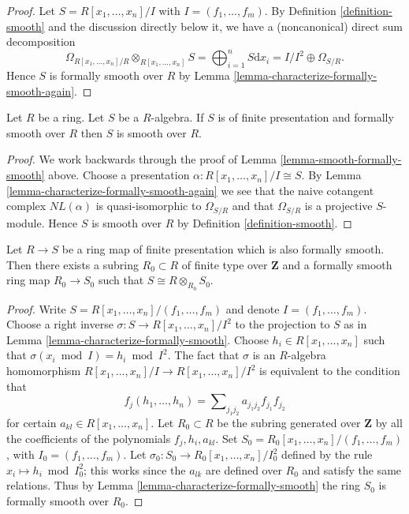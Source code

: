 \begin{proof}
Let $S = R[x_1, \ldots, x_n]/I$ with $I = (f_1, \ldots, f_m)$.
By Definition \ref{definition-smooth}
and the discussion directly below it, we have
a (noncanonical) direct sum decomposition
$$
\Omega_{R[x_1, \ldots, x_n]/R} \otimes_{R[x_1, \ldots, x_n]} S
= \bigoplus_{i = 1}^n S \text{d}x_i
= I/I^2 \oplus \Omega_{S/R}.
$$
Hence $S$ is formally smooth over $R$ by
Lemma \ref{lemma-characterize-formally-smooth-again}.
\end{proof}

\begin{lemma}
\label{lemma-formally-smooth-smooth}
Let $R$ be a ring. Let $S$ be a $R$-algebra.
If $S$ is of finite presentation and formally smooth over $R$
then $S$ is smooth over $R$.
\end{lemma}

\begin{proof}
We work backwards through the proof of
Lemma \ref{lemma-smooth-formally-smooth} above.
Choose a presentation $\alpha : R[x_1, \ldots, x_n]/I \cong S$.
By Lemma \ref{lemma-characterize-formally-smooth-again}
we see that the naive cotangent complex $NL(\alpha)$
is quasi-isomorphic to $\Omega_{S/R}$ and that $\Omega_{S/R}$
is a projective $S$-module. Hence $S$ is smooth over $R$ by
Definition \ref{definition-smooth}.
\end{proof}

\begin{lemma}
\label{lemma-finite-presentation-fs-Noetherian}
Let $R \to S$ be a ring map of finite presentation which is
also formally smooth. Then there exists a subring $R_0 \subset R$
of finite type over $\mathbf{Z}$ and a formally smooth
ring map $R_0 \to S_0$ such that $S \cong R \otimes_{R_0} S_0$.
\end{lemma}

\begin{proof}
Write $S = R[x_1, \ldots, x_n]/(f_1, \ldots, f_m)$
and denote $I = (f_1, \ldots, f_m)$.
Choose a right inverse
$\sigma : S \to R[x_1, \ldots, x_n]/I^2$
to the projection to $S$ as in
Lemma \ref{lemma-characterize-formally-smooth}.
Choose $h_i \in R[x_1, \ldots, x_n]$ such that
$\sigma(x_i \bmod I) = h_i \bmod I^2$.
The fact that $\sigma$ is an $R$-algebra homomorphism
$R[x_1, \ldots, x_n]/I \to R[x_1, \ldots, x_n]/I^2$
is equivalent to the condition that
$$
f_j(h_1, \ldots, h_n) = \sum\nolimits_{j_1 j_2} a_{j_1 j_2} f_{j_1} f_{j_2}
$$
for certain $a_{kl} \in R[x_1, \ldots, x_n]$.
Let $R_0 \subset R$ be the subring generated over $\mathbf{Z}$
by all the coefficients of the polynomials $f_j, h_i, a_{kl}$.
Set $S_0 = R_0[x_1, \ldots, x_n]/(f_1, \ldots, f_m)$,
with $I_0 = (f_1, \ldots, f_m)$.
Let $\sigma_0 : S_0 \to R_0[x_1, \ldots, x_n]/I_0^2$ defined by
the rule $x_i \mapsto h_i \bmod I_0^2$; this works since the
$a_{lk}$ are defined over $R_0$ and satisfy the same relations.
Thus by Lemma \ref{lemma-characterize-formally-smooth}
the ring $S_0$ is formally smooth over $R_0$.
\end{proof}

